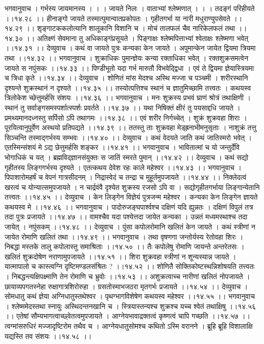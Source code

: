 \documentclass[11pt]{book}
\begin{document}
\begin{landscape}
भगवानुवाच ।
गर्भस्य जायमानस्य  ।  ।  ।  जायते निलः ।
वाताभ्यां श्लेष्मणात्  ।  ।  । तदङ्गं परिहीयते ।।१४.२८ ।।
हीनाङ्गो जायते तस्मात्पुमान्वातप्रकोपतः ।
गृहीतगर्भा या नारी मधुराण्युपसेवते ।।१४.२९ ।।
शृङ्गाटककलोत्यानि शालूकानि विशानि च ।
मोचं तालफलं चैव नारिकेलफलं तथा ।।१४.३० ।।
अतिक्ष्णं सेवमाना तु अधिकाङ्गंप्रसूयते ।
पिङ्गाक्षः श्लेष्मपित्ताभ्यां श्वेताक्षः श्लेष्मणा भवेत् ।।१४.३१ ।।
देव्युवाच ।
कथं वा जायते पुत्रः कन्यका केन जायते ।
अपुमान्केन जायेत द्वियमा त्रियमा तथा ।।१४.३२ ।।
भगवानुवाच ।
शुक्राधिकः पुमान्ज्ञेयः कन्या रक्ताधिका भवेत् ।
रक्तशुक्रसमत्वेन जायते स नपुंसकः ।।१४.३३ ।।
पिण्डीभूतो यदा गर्भ मारुतौ विभवेद्द्विधा ।
एवं ते द्वियमा ज्ञेयास्त्रियमा च त्रिधा कृते ।।१४.३४ ।।
देव्युवाच ।
शोणितं मांस मेदश्च अस्थि मज्जा च पञ्चमी ।
शरीरस्थानि दृश्यन्ते शुक्रस्थानं न दृश्यते ।।१४.३५ ।।
तस्योत्पत्तिश्च स्थानं च ज्ञातुमिच्छामि तत्त्वतः ।
कथयस्व त्रिलोकेश च्छेत्तुमर्हसि संशयः ।।१४.३६ ।।
भगवानुवाच ।
मनः शुक्रस्य प्रभवं घ्राणं श्रोत्रं तथाक्षिणी ।
स्थानं तु सर्वाङ्गसमस्पर्शात्स्पर्शः प्रवर्तते ।।१४.३७ ।।
यथा निषिक्तं क्षीरं तु पयसाद्दधि जायते ।
प्रमथ्यमानदध्नस्तु सर्पिसो ऽपि तथागमः ।।१४.३८ ।।
एवं शरीर निर्गच्चेत्  । शुक्रं शुक्रवहा शिराः ।
पूरयित्वानुपूर्वेण अस्थयो प्रतिपद्यते ।।१४.३९ ।।
ततस्तु ताः शुक्रवहा मेड्ह्रनाभीमनुसृताः ।
नाशुक्रं तत्तु सिञ्चन्ति तस्माद्गर्भस्य सम्भवः ।।१४.४० ।।
देव्युवाच ।
कथं वेदयते जाति कथं जातिस्मरो भवेत् ।
एतस्मिन्संशयं मे ऽद्य छेत्तुमर्हसि शङ्कर ।।१४.४१ ।।
भगवानुवाच ।
भावितात्मां च यो जन्तुर्देवि भोगाधिकं च यत् ।
ब्रह्मविद्ज्ञानसंयुक्तः स जातिं स्मरते पुमान् ।।१४.४२ ।।
देव्युवाच ।
कथं सद्यो गृहीतस्य लिङ्गगर्भस्य दृश्यते ।
एतत्कथय देवेश रहः काले महेश्वर ।।१४.४३ ।।
भगवानुवाच ।
पिपाशारोमहर्षं च वेपनं गात्रसीदनम् ।
निद्रास्वेदं च तन्द्रा च मुहूर्तमुपजायते ।।१४.४४ ।।
निक्लेदत्वं खरत्वं च योन्यात्समुपजायते ।
न चार्द्रवंवै दृश्येत शुक्रस्य रजसो ऽपि वा । 
सद्योगृहीतगर्भाया लिङ्गान्येतानि तत्त्वतः ।।१४.४५ ।।
देव्युवाच ।
केन लिङ्गेन विज्ञेयं पुत्रजन्म महेश्वर ।
कन्यका केन लिङ्गेन ज्ञायते कथयस्व मे ।।१४.४६ ।।
भगवानुवाच ।
पादोरुजङ्घपार्श्वश्च दक्षिणं यदि ह्युन्नतः ।
दक्षिणं विपुलं तत्र तदा पुत्रः प्रजायते ।।१४.४७ ।।
वामश्चैव यदा पश्येत्तदा जायेत कन्यका ।
उन्नतं मध्यमस्थाश्च तदा जायेत्  । नपुंसकम् ।।१४.४८ ।।
देव्युवाच ।
पुंसा कपोलरोमानि खलितं केन जायते ।
कथं स्त्रीणां न जायेत रोमाणि खलितं तथा ।।१४.४९ ।।
भगवानुवाच ।
तथा वृषणगा जन्तोर्यस्य रेतोवहा शिरः ।
निबद्धा मस्तके तालु कपोलास्तु समाश्रिताः ।।१४.५० ।।
तैः कपोलेषु रोमाणि जायन्ते अन्तरेतसः ।
खलितं शुक्रदोषेण नराणामुपजायते ।।१४.५१ ।।
शिरा शुक्रवहा स्त्रीणां न शून्यस्यान्न जायते ।
यात्मापालो च कास्त्वग्नि दृष्टिमण्डलसंश्रितः ? ।।१४.५२ ।।
शोणितै सोक्तिकोष्टस्थन्निशोषयति तत्त्वतः ।
निबद्धन्त्यक्षिपक्ष्माणि तेन रोमाणि च भ्रुवोः ।।१४.५३ ।।
अशुक्रत्वाच्च नारीणां खलितं नोपजायते ।
छायाव्यपगतस्नेहा रुक्षागात्रशिरोरुहा ।
ग्रसतोस्माभजठरा मृतगर्भः प्रजायते ।।१४.५४ ।।
देव्युवाच ।
सोमधातु कथं ज्ञेया अग्निधातुस्तथेश्वर ।
पृथग्भागविशेषेण कथयस्व महेश्वर ।।१४.५५ ।।
भगवानुवाच ।
श्लेष्ममेदस्तथा स्नायुः अस्थिदन्तनखानि च ।
स्त्रियास्तन्यश्च शुक्रश्च यच्च श्वेतं तथाक्षिषु ।।१४.५६ ।।
एतेषां सौम्यभागत्वाच्छ्वेतत्वमुपजायते ।
आग्नेयभावाद्रक्तत्वं कृष्णत्वं चापि गच्छति ।।१४.५७ ।।
त्वग्मांसरुधिरं मज्जादृष्टिरोम तथैव च ।
आग्नेयधातुसोमश्च कथितो ऽस्मि वरानने ।
ब्रूहि ब्रूहि विशालाक्षि यद्यस्ति तव संशयः ।।१४.५८ ।।


\end{landscape}
\end{document}
